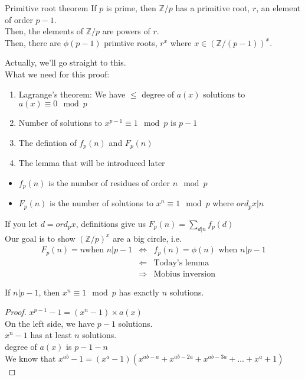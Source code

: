     \begin{theorem}{Primitive root theorem}
      If $p$ is prime, then $\mathbb{Z} / p$ has a primitive root, $r$, an
      element of order $p-1$.\\
      Then, the elements of $\mathbb{Z}/p$ are powers of $r$.\\
      Then, there are $\phi(p-1)$ primtive roots, $r^x$ where $x \in
      (\mathbb{Z}/(p-1))^x$.
    \end{theorem}
    Actually, we'll go straight to this.\\
    What we need for this proof:
    \begin{enumerate}
      \item Lagrange's theorem: We have $\le$ degree of $a(x)$ solutions to 
        $a(x) \equiv 0 \mod p$\\
      \item Number of solutions to $x^{p-1} \equiv 1 \mod p$ is $p-1$
      \item The defintion of $f_p(n)$ and $F_p(n)$
      \item The lemma that will be introduced later
    \end{enumerate}
    \begin{definition}
      \begin{itemize}
        \item $f_p(n)$ is the number of residues of order $n \mod p$
        \item $F_p(n)$ is the number of solutions to $x^n \equiv 1 \mod p$
          where $ord_p x | n$
      \end{itemize}
    \end{definition}
      If you let $d = ord_px$, definitions give us $F_p(n) = \sum_{d|n}
        f_p(d)$\\
      Our goal is to show $(\mathbb{Z}/p)^x$ are a big circle, i.e.
      \begin{eqnarray*}
        F_p(n)  =  n \text{when }n | p-1 & \Leftrightarrow &
        f_p(n) = \phi(n) \text{ when } n | p-1\\
        & \Leftarrow & \text{Today's lemma}\\
        & \Rightarrow & \text{Mobius inversion}
      \end{eqnarray*}
    \begin{lemma}
      If $n | p-1$, then $x^n \equiv 1 \mod p$ has exactly $n$ solutions.
    \end{lemma}
    \begin{proof}
      $x^{p-1} - 1 = (x^n -1) \times a(x)$\\
      On the left side, we have $p-1$ solutions.\\
      $x^n - 1$ has at least $n$ solutions.\\
      degree of $a(x)$ is $p-1-n$\\
      We know that $x^{ab} - 1 = (x^a - 1)(x^{ab-a} + x^{ab-2a} + x^{ab - 3a}
       + \ldots + x^a + 1)$\\
    \end{proof}

